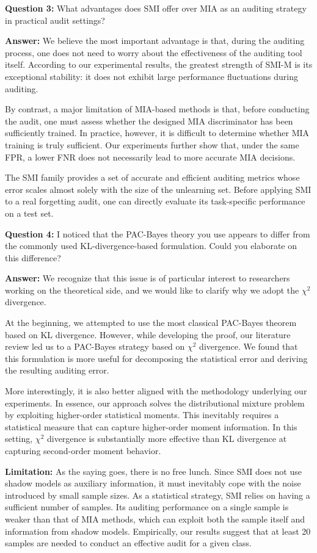 \documentclass{article}
\theoremstyle{plain}
\theoremstyle{definition}
\theoremstyle{remark}
\begin{document}
\textbf{Question 3:} What advantages does SMI offer over MIA as an auditing strategy in practical audit settings?

\textbf{Answer:} We believe the most important advantage is that, during the auditing process, one does not need to worry about the effectiveness of the auditing tool itself. According to our experimental results, the greatest strength of SMI-M is its exceptional stability: it does not exhibit large performance fluctuations during auditing.

By contrast, a major limitation of MIA-based methods is that, before conducting the audit, one must assess whether the designed MIA discriminator has been sufficiently trained. In practice, however, it is difficult to determine whether MIA training is truly sufficient. Our experiments further show that, under the same FPR, a lower FNR does not necessarily lead to more accurate MIA decisions.

The SMI family provides a set of accurate and efficient auditing metrics whose error scales almost solely with the size of the unlearning set. Before applying SMI to a real forgetting audit, one can directly evaluate its task-specific performance on a test set.

\textbf{Question 4:} I noticed that the PAC-Bayes theory you use appears to differ from the commonly used KL-divergence-based formulation. Could you elaborate on this difference?

\textbf{Answer:} We recognize that this issue is of particular interest to researchers working on the theoretical side, and we would like to clarify why we adopt the $\chi^2$ divergence.

At the beginning, we attempted to use the most classical PAC-Bayes theorem based on KL divergence. However, while developing the proof, our literature review led us to a PAC-Bayes strategy based on $\chi^2$ divergence. We found that this formulation is more useful for decomposing the statistical error and deriving the resulting auditing error.

More interestingly, it is also better aligned with the methodology underlying our experiments. In essence, our approach solves the distributional mixture problem by exploiting higher-order statistical moments. This inevitably requires a statistical measure that can capture higher-order moment information. In this setting, $\chi^2$ divergence is substantially more effective than KL divergence at capturing second-order moment behavior.

\textbf{Limitation:} As the saying goes, there is no free lunch. Since SMI does not use shadow models as auxiliary information, it must inevitably cope with the noise introduced by small sample sizes. As a statistical strategy, SMI relies on having a sufficient number of samples. Its auditing performance on a single sample is weaker than that of MIA methods, which can exploit both the sample itself and information from shadow models. Empirically, our results suggest that at least 20 samples are needed to conduct an effective audit for a given class.
\end{document}
